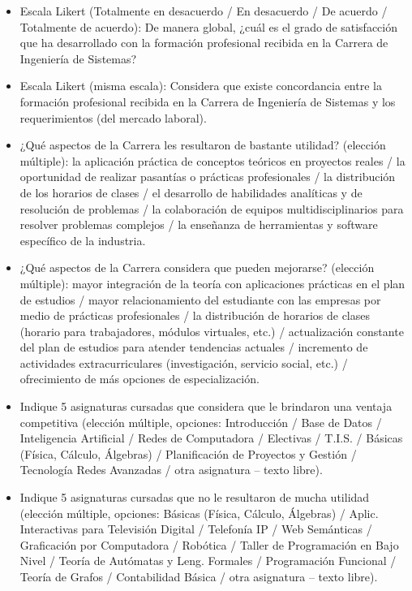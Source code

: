 \documentclass[12pt]{article}
\begin{document}
\begin{itemize}[nosep]
    \item Escala Likert (Totalmente en desacuerdo / En desacuerdo / De
    acuerdo / Totalmente de acuerdo): De manera global, ¿cuál es el grado
    de satisfacción que ha desarrollado con la formación profesional
    recibida en la Carrera de Ingeniería de Sistemas?
    \item Escala Likert (misma escala): Considera que existe concordancia
    entre la formación profesional recibida en la Carrera de Ingeniería
    de Sistemas y los requerimientos (del mercado laboral).
    \item ¿Qué aspectos de la Carrera les resultaron de bastante utilidad?
    (elección múltiple): la aplicación práctica de conceptos teóricos en
    proyectos reales / la oportunidad de realizar pasantías o prácticas
    profesionales / la distribución de los horarios de clases / el
    desarrollo de habilidades analíticas y de resolución de problemas /
    la colaboración de equipos multidisciplinarios para resolver
    problemas complejos / la enseñanza de herramientas y software
    específico de la industria.
    \item ¿Qué aspectos de la Carrera considera que pueden mejorarse?
    (elección múltiple): mayor integración de la teoría con aplicaciones
    prácticas en el plan de estudios / mayor relacionamiento del
    estudiante con las empresas por medio de prácticas profesionales /
    la distribución de horarios de clases (horario para trabajadores,
    módulos virtuales, etc.) / actualización constante del plan de
    estudios para atender tendencias actuales / incremento de actividades
    extracurriculares (investigación, servicio social, etc.) /
    ofrecimiento de más opciones de especialización.
    \item Indique 5 asignaturas cursadas que considera que le brindaron
    una ventaja competitiva (elección múltiple, opciones: Introducción /
    Base de Datos / Inteligencia Artificial / Redes de Computadora /
    Electivas / T.I.S. / Básicas (Física, Cálculo, Álgebras) /
    Planificación de Proyectos y Gestión / Tecnología Redes Avanzadas /
    otra asignatura -- texto libre).
    \item Indique 5 asignaturas cursadas que no le resultaron de mucha
    utilidad (elección múltiple, opciones: Básicas (Física, Cálculo,
    Álgebras) / Aplic. Interactivas para Televisión Digital / Telefonía
    IP / Web Semánticas / Graficación por Computadora / Robótica / Taller
    de Programación en Bajo Nivel / Teoría de Autómatas y Leng. Formales /
    Programación Funcional / Teoría de Grafos / Contabilidad Básica /
    otra asignatura -- texto libre).
\end{itemize}
\end{document}
